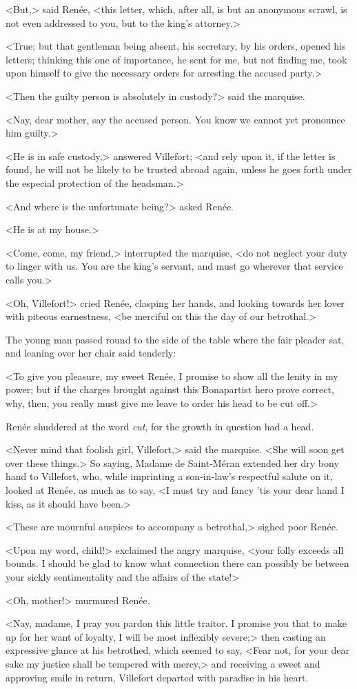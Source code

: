  <But,> said Renée, <this letter, which, after all, is but an anonymous scrawl, is not even addressed to you, but to the king's attorney.>  
 
 <True; but that gentleman being absent, his secretary, by his orders, opened his letters; thinking this one of importance, he sent for me, but not finding me, took upon himself to give the necessary orders for arresting the accused party.> 

 <Then the guilty person is absolutely in custody?> said the marquise. 

 <Nay, dear mother, say the accused person. You know we cannot yet pronounce him guilty.> 

 <He is in safe custody,> answered Villefort; <and rely upon it, if the letter is found, he will not be likely to be trusted abroad again, unless he goes forth under the especial protection of the headsman.> 

 <And where is the unfortunate being?> asked Renée. 

 <He is at my house.> 

 <Come, come, my friend,> interrupted the marquise, <do not neglect your duty to linger with us. You are the king's servant, and must go wherever that service calls you.> 

 <Oh, Villefort!> cried Renée, clasping her hands, and looking towards her lover with piteous earnestness, <be merciful on this the day of our betrothal.> 

 The young man passed round to the side of the table where the fair pleader sat, and leaning over her chair said tenderly: 

 <To give you pleasure, my sweet Renée, I promise to show all the lenity in my power; but if the charges brought against this Bonapartist hero prove correct, why, then, you really must give me leave to order his head to be cut off.> 

 Renée shuddered at the word \textit{cut}, for the growth in question had a head. 

 <Never mind that foolish girl, Villefort,> said the marquise. <She will soon get over these things.> So saying, Madame de Saint-Méran extended her dry bony hand to Villefort, who, while imprinting a son-in-law's respectful salute on it, looked at Renée, as much as to say, <I must try and fancy 'tis your dear hand I kiss, as it should have been.> 

 <These are mournful auspices to accompany a betrothal,> sighed poor Renée. 

 <Upon my word, child!> exclaimed the angry marquise, <your folly exceeds all bounds. I should be glad to know what connection there can possibly be between your sickly sentimentality and the affairs of the state!> 

 <Oh, mother!> murmured Renée. 

 <Nay, madame, I pray you pardon this little traitor. I promise you that to make up for her want of loyalty, I will be most inflexibly severe;> then casting an expressive glance at his betrothed, which seemed to say, <Fear not, for your dear sake my justice shall be tempered with mercy,> and receiving a sweet and approving smile in return, Villefort departed with paradise in his heart. 